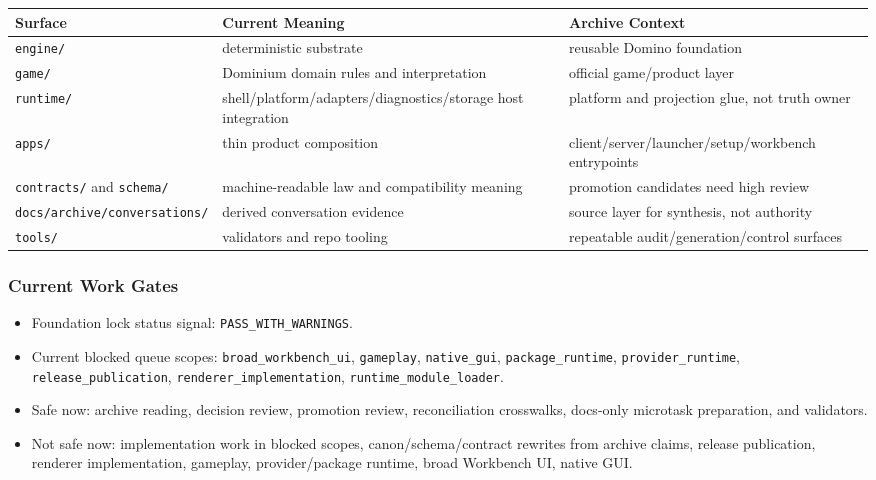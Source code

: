 \documentclass[9pt,a4paper,openany]{book}
\newcommand{\toprule}{\hline}
\newcommand{\midrule}{\hline}
\newcommand{\bottomrule}{\hline}
\begin{document}
\begin{center}
{\small\renewcommand{\arraystretch}{1.18}
\begin{tabularx}{\linewidth}{@{}>{\raggedright\arraybackslash}X >{\raggedright\arraybackslash}X >{\raggedright\arraybackslash}X@{}}
\toprule
\textbf{Surface} & \textbf{Current Meaning} & \textbf{Archive Context} \\
\midrule
\texttt{engine/\allowbreak{}} & deterministic substrate & reusable Domino foundation \\
\texttt{game/\allowbreak{}} & Dominium domain rules and interpretation & official game/\allowbreak{}product layer \\
\texttt{runtime/\allowbreak{}} & shell/\allowbreak{}platform/\allowbreak{}adapters/\allowbreak{}diagnostics/\allowbreak{}storage host integration & platform and projection glue, not truth owner \\
\texttt{apps/\allowbreak{}} & thin product composition & client/\allowbreak{}server/\allowbreak{}launcher/\allowbreak{}setup/\allowbreak{}workbench entrypoints \\
\texttt{contracts/\allowbreak{}} and \texttt{schema/\allowbreak{}} & machine-\allowbreak{}readable law and compatibility meaning & promotion candidates need high review \\
\texttt{docs/\allowbreak{}archive/\allowbreak{}conversations/\allowbreak{}} & derived conversation evidence & source layer for synthesis, not authority \\
\texttt{tools/\allowbreak{}} & validators and repo tooling & repeatable audit/\allowbreak{}generation/\allowbreak{}control surfaces \\
\bottomrule
\end{tabularx}
}
\end{center}

\subsubsection{Current Work Gates}

\begin{itemize}
\item Foundation lock status signal: \texttt{PASS\_\allowbreak{}WITH\_\allowbreak{}WARNINGS}.\allowbreak{}
\item Current blocked queue scopes: \texttt{broad\_\allowbreak{}workbench\_\allowbreak{}ui}, \texttt{gameplay}, \texttt{native\_\allowbreak{}gui}, \texttt{package\_\allowbreak{}runtime}, \texttt{provider\_\allowbreak{}runtime}, \texttt{release\_\allowbreak{}publication}, \texttt{renderer\_\allowbreak{}implementation}, \texttt{runtime\_\allowbreak{}module\_\allowbreak{}loader}.\allowbreak{}
\item Safe now: archive reading, decision review, promotion review, reconciliation crosswalks, docs-\allowbreak{}only microtask preparation, and validators.\allowbreak{}
\item Not safe now: implementation work in blocked scopes, canon/\allowbreak{}schema/\allowbreak{}contract rewrites from archive claims, release publication, renderer implementation, gameplay, provider/\allowbreak{}package runtime, broad Workbench UI, native GUI.\allowbreak{}
\end{itemize}
\end{document}
